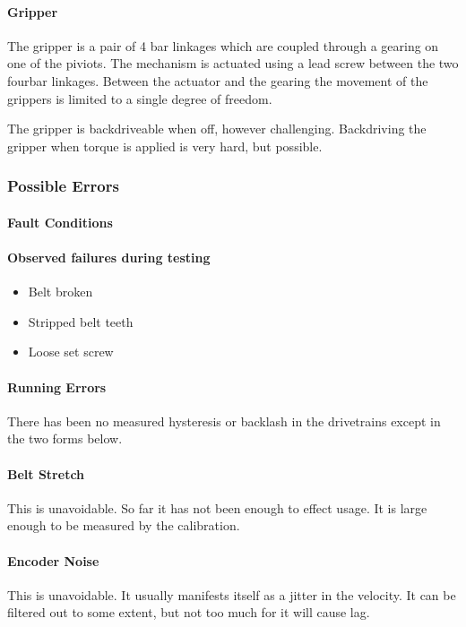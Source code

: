 \paragraph{Gripper }
The gripper is a pair of 4 bar linkages which are coupled through a
gearing on one of the piviots.  The mechanism is actuated using a lead
screw between the two fourbar linkages. Between the actuator and the
gearing the movement of the grippers is limited to a single degree of
freedom.

The gripper is backdriveable when off, however challenging.
Backdriving the gripper when torque is applied is very hard, but
possible.

\subsubsection{Possible Errors}
\paragraph{Fault Conditions}
\paragraph{Observed failures during testing}
\begin{itemize}
\item Belt broken 
\item Stripped belt teeth
\item Loose set screw
\end{itemize}
\paragraph{Running Errors}
There has been no measured hysteresis or backlash in the drivetrains
except in the two forms below.  

\paragraph{Belt Stretch}
This is unavoidable.  So far it has not been enough to effect usage.
It is large enough to be measured by the calibration.
\paragraph{Encoder Noise}
This is unavoidable.  It usually manifests itself as a jitter in the
velocity.  It can be filtered out to some extent, but not too much for
it will cause lag.



